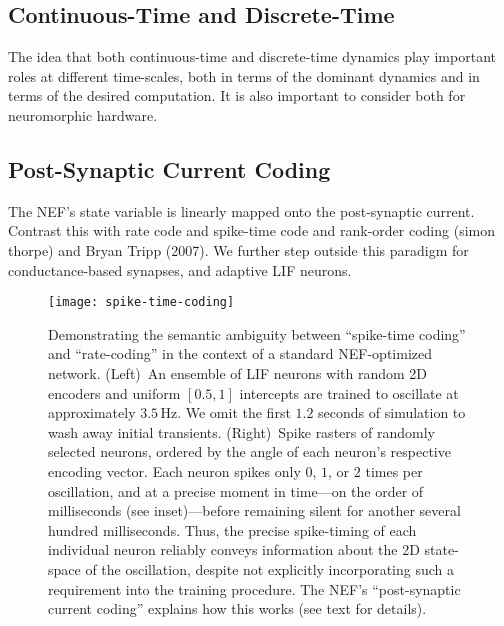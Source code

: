 \subsection{Continuous-Time and Discrete-Time}

The idea that both continuous-time and discrete-time dynamics play important roles at different time-scales, both in terms of the dominant dynamics and in terms of the desired computation.
It is also important to consider both for neuromorphic hardware.

\subsection{Post-Synaptic Current Coding}

The NEF's state variable is linearly mapped onto the post-synaptic current.
Contrast this with rate code and spike-time code and rank-order coding (simon thorpe) and Bryan Tripp (2007).
We further step outside this paradigm for conductance-based synapses, and adaptive LIF neurons.


\begin{figure}
    \centering
    \texttt{[image: spike-time-coding]}
     
    \caption{\label{fig:spike-time-coding} 
      Demonstrating the semantic ambiguity between ``spike-time coding'' and ``rate-coding'' in the context of a standard NEF-optimized network.
      (Left)~An ensemble of  LIF neurons with random 2D encoders and uniform $[0.5, 1]$ intercepts are trained to oscillate at approximately $3.5$\,Hz.
      We omit the first $1.2$ seconds of simulation to wash away initial transients.
      (Right)~Spike rasters of  randomly selected neurons, ordered by the angle of each neuron's respective encoding vector.
      Each neuron spikes only $0$, $1$, or $2$ times per oscillation, and at a precise moment in time---on the order of milliseconds (see inset)---before remaining silent for another several hundred milliseconds.
      Thus, the precise spike-timing of each individual neuron reliably conveys information about the 2D state-space of the oscillation, despite not explicitly incorporating such a requirement into the training procedure.
      The NEF's ``post-synaptic current coding'' explains how this works (see text for details).
    }
\end{figure}

